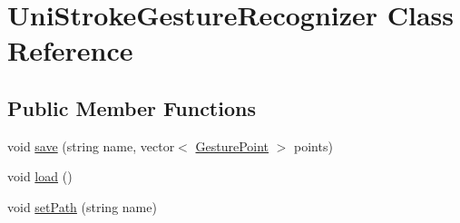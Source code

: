 \hypertarget{classUniStrokeGestureRecognizer}{\section{\-Uni\-Stroke\-Gesture\-Recognizer \-Class \-Reference}
\label{classUniStrokeGestureRecognizer}
}
\subsection*{\-Public \-Member \-Functions}
\begin{DoxyCompactItemize}
\item 
void \hyperlink{classUniStrokeGestureRecognizer_a17a223c7cfb8908655f099806b6ec0df}{save} (string name, vector$<$ \hyperlink{classGesturePoint}{\-Gesture\-Point} $>$ points)
\item 
void \hyperlink{classUniStrokeGestureRecognizer_ac3365379a09d89079ba0ac515f6376e3}{load} ()
\item 
void \hyperlink{classUniStrokeGestureRecognizer_a826b32deaa2eae9a81cda3ed29de05de}{set\-Path} (string name)
\end{DoxyCompactItemize}


